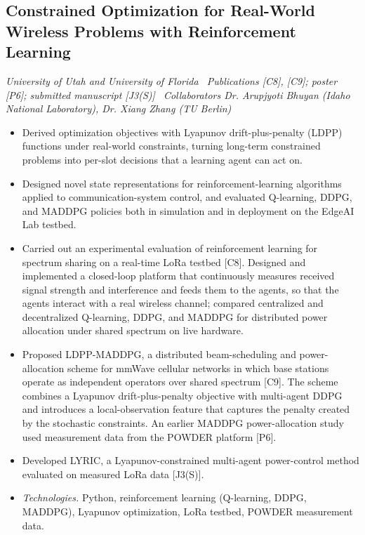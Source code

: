 \documentclass[10pt]{article}
\newcommand{\proj}[2]{\subsection*{#1}{\small\itshape #2}\par}
\newcommand{\tech}[1]{\item \textit{Technologies.} #1}
\begin{document}
\proj{Constrained Optimization for Real-World Wireless Problems with Reinforcement Learning}{University of Utah and University of Florida \textbullet\ Publications [C8], [C9]; poster [P6]; submitted manuscript [J3(S)] \textbullet\ Collaborators Dr. Arupjyoti Bhuyan (Idaho National Laboratory), Dr. Xiang Zhang (TU Berlin)}
\begin{itemize}
\item Derived optimization objectives with Lyapunov drift-plus-penalty (LDPP) functions under real-world constraints, turning long-term constrained problems into per-slot decisions that a learning agent can act on.
\item Designed novel state representations for reinforcement-learning algorithms applied to communication-system control, and evaluated Q-learning, DDPG, and MADDPG policies both in simulation and in deployment on the EdgeAI Lab testbed.
\item Carried out an experimental evaluation of reinforcement learning for spectrum sharing on a real-time LoRa testbed [C8]. Designed and implemented a closed-loop platform that continuously measures received signal strength and interference and feeds them to the agents, so that the agents interact with a real wireless channel; compared centralized and decentralized Q-learning, DDPG, and MADDPG for distributed power allocation under shared spectrum on live hardware.
\item Proposed LDPP-MADDPG, a distributed beam-scheduling and power-allocation scheme for mmWave cellular networks in which base stations operate as independent operators over shared spectrum [C9]. The scheme combines a Lyapunov drift-plus-penalty objective with multi-agent DDPG and introduces a local-observation feature that captures the penalty created by the stochastic constraints. An earlier MADDPG power-allocation study used measurement data from the POWDER platform [P6].
\item Developed LYRIC, a Lyapunov-constrained multi-agent power-control method evaluated on measured LoRa data [J3(S)].
\tech{Python, reinforcement learning (Q-learning, DDPG, MADDPG), Lyapunov optimization, LoRa testbed, POWDER measurement data.}
\end{itemize}
\end{document}
